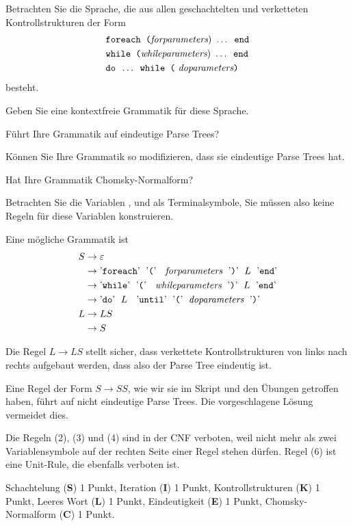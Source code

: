 Betrachten Sie die Sprache, die aus allen geschachtelten
und verketteten Kontrollstrukturen der Form
\begin{align*}
&\texttt{foreach (} \text{\em forparameters}\text{) } \dots \texttt{ end}
\\
&\texttt{while (} \text{\em whileparameters}\text{) } \dots \texttt{ end}
\\
&\texttt{do } \dots \texttt{ while (}\text{ \em doparameters\tt)}
\end{align*}
besteht.
\begin{teilaufgaben}
\item 
Geben Sie eine kontextfreie Grammatik für diese Sprache.
\item 
Führt Ihre Grammatik auf eindeutige Parse Trees?
\item 
Können Sie Ihre Grammatik so modifizieren, dass sie eindeutige Parse Trees hat.
\item 
Hat Ihre Grammatik Chomsky-Normalform?
\end{teilaufgaben}

\begin{hinweis}
Betrachten Sie die Variablen
,
 und
als Terminalsymbole, Sie müssen also keine Regeln für diese Variablen
konstruieren.
\end{hinweis}


\begin{loesung}
\begin{teilaufgaben}
\item
Eine mögliche Grammatik ist
\begin{align}
S&\rightarrow \varepsilon
\\
 &\rightarrow
\text{'{\tt foreach}'\; '{\tt (}' \; {\em forparameters}\; '{\tt)}'\;
$L$
\;'{\tt end}'}
\\
 &\rightarrow
\text{'{\tt while}'\; '{\tt (}' \; {\em whileparameters}\; '{\tt)}'\;
$L$
\;'{\tt end}'}
\\
 &\rightarrow
\text{'{\tt do}'\;
$L$
\; '{\tt until}'\; '{\tt (}'\; {\em doparameters}\;
'{\tt)}'}
\\
L&\rightarrow LS
\\
 &\rightarrow S
\\
\end{align}
\item
Die Regel $L\to LS$ stellt sicher, dass verkettete Kontrollstrukturen
von links nach rechts aufgebaut werden, dass also der Parse Tree eindeutig ist.
\item
Eine Regel der Form $S\to SS$, wie wir sie im Skript und den Übungen
getroffen haben, führt auf nicht eindeutige Parse Trees.
Die vorgeschlagene Lösung vermeidet dies.
\item
Die Regeln (2), (3) und (4) sind in der CNF verboten,
weil nicht mehr als zwei Variablensymbole auf der rechten Seite einer Regel
stehen dürfen.
Regel (6) ist eine Unit-Rule, die ebenfalls verboten ist.
\qedhere
\end{teilaufgaben}
\end{loesung}

\begin{bewertung}
Schachtelung ({\bf S}) 1 Punkt,
Iteration ({\bf I}) 1 Punkt,
Kontrollstrukturen ({\bf K}) 1 Punkt,
Leeres Wort ({\bf L}) 1 Punkt,
Eindeutigkeit ({\bf E}) 1 Punkt,
Chomsky-Normalform ({\bf C}) 1 Punkt.
\end{bewertung}


